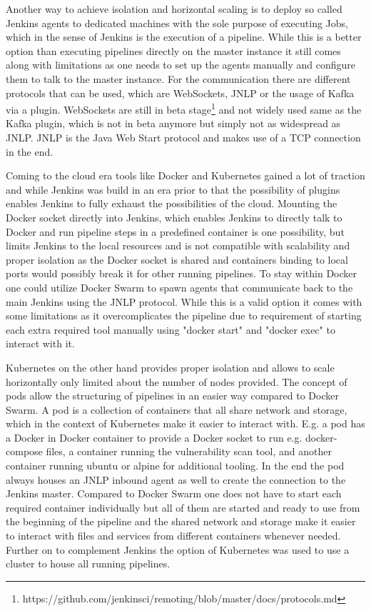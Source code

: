 Another way to achieve isolation and horizontal scaling is to deploy so called Jenkins agents to dedicated machines with the sole purpose of executing Jobs, which in the sense of Jenkins is the execution of a pipeline. While this is a better option than executing pipelines directly on the master instance it still comes along with limitations as one needs to set up the agents manually and configure them to talk to the master instance. For the communication there are different protocols that can be used, which are WebSockets, JNLP or the usage of Kafka via a plugin. WebSockets are still in beta stage\footnote{https://github.com/jenkinsci/remoting/blob/master/docs/protocols.md} and not widely used same as the Kafka plugin, which is not in beta anymore but simply not as widespread as JNLP. JNLP is the Java Web Start protocol and makes use of a TCP connection in the end.

Coming to the cloud era tools like Docker and Kubernetes gained a lot of traction and while Jenkins was build in an era prior to that the possibility of plugins enables Jenkins to fully exhaust the possibilities of the cloud.
Mounting the Docker socket directly into Jenkins, which enables Jenkins to directly talk to Docker and run pipeline steps in a predefined container is one possibility, but limits Jenkins to the local resources and is not compatible with scalability and proper isolation as the Docker socket is shared and containers binding to local ports would possibly break it for other running pipelines. To stay within Docker one could utilize Docker Swarm to spawn agents that communicate back to the main Jenkins using the JNLP protocol. While this is a valid option it comes with some limitations as it overcomplicates the pipeline due to requirement of starting each extra required tool manually using "docker start" and "docker exec" to interact with it.

Kubernetes on the other hand provides proper isolation and allows to scale horizontally only limited about the number of nodes provided. The concept of pods allow the structuring of pipelines in an easier way compared to Docker Swarm. A pod is a collection of containers that all share network and storage, which in the context of Kubernetes make it easier to interact with. E.g. a pod has a Docker in Docker container to provide a Docker socket to run e.g. docker-compose files, a container running the vulnerability scan tool, and another container running ubuntu or alpine for additional tooling. In the end the pod always houses an JNLP inbound agent as well to create the connection to the Jenkins master. Compared to Docker Swarm one does not have to start each required container individually but all of them are started and ready to use from the beginning of the pipeline and the shared network and storage make it easier to interact with files and services from different containers whenever needed.
Further on to complement Jenkins the option of Kubernetes was used to use a cluster to house all running pipelines.

